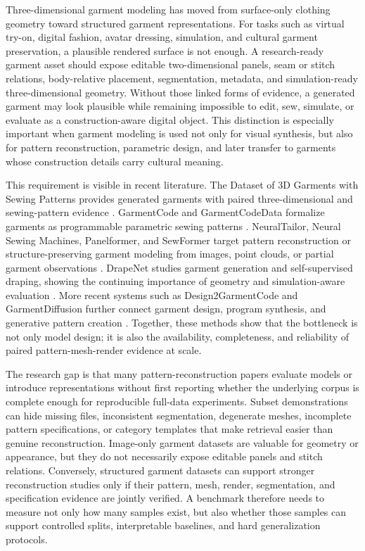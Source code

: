 \documentclass[pdflatex,sn-mathphys-num]{sn-jnl}
\begin{document}
Three-dimensional garment modeling has moved from surface-only clothing geometry toward structured garment representations. For tasks such as virtual try-on, digital fashion, avatar dressing, simulation, and cultural garment preservation, a plausible rendered surface is not enough. A research-ready garment asset should expose editable two-dimensional panels, seam or stitch relations, body-relative placement, segmentation, metadata, and simulation-ready three-dimensional geometry. Without those linked forms of evidence, a generated garment may look plausible while remaining impossible to edit, sew, simulate, or evaluate as a construction-aware digital object. This distinction is especially important when garment modeling is used not only for visual synthesis, but also for pattern reconstruction, parametric design, and later transfer to garments whose construction details carry cultural meaning.

This requirement is visible in recent literature. The Dataset of 3D Garments with Sewing Patterns provides generated garments with paired three-dimensional and sewing-pattern evidence \cite{korosteleva2021dataset}. GarmentCode and GarmentCodeData formalize garments as programmable parametric sewing patterns \cite{garmentcode2023,garmentcodedata2024}. NeuralTailor, Neural Sewing Machines, Panelformer, and SewFormer target pattern reconstruction or structure-preserving garment modeling from images, point clouds, or partial garment observations \cite{neuraltailor2022,nsm2022,panelformer2024,sewformer2023}. DrapeNet studies garment generation and self-supervised draping, showing the continuing importance of geometry and simulation-aware evaluation \cite{drapenet2023}. More recent systems such as Design2GarmentCode and GarmentDiffusion further connect garment design, program synthesis, and generative pattern creation \cite{design2garmentcode2025,garmentdiffusion2025}. Together, these methods show that the bottleneck is not only model design; it is also the availability, completeness, and reliability of paired pattern-mesh-render evidence at scale.

The research gap is that many pattern-reconstruction papers evaluate models or introduce representations without first reporting whether the underlying corpus is complete enough for reproducible full-data experiments. Subset demonstrations can hide missing files, inconsistent segmentation, degenerate meshes, incomplete pattern specifications, or category templates that make retrieval easier than genuine reconstruction. Image-only garment datasets are valuable for geometry or appearance, but they do not necessarily expose editable panels and stitch relations. Conversely, structured garment datasets can support stronger reconstruction studies only if their pattern, mesh, render, segmentation, and specification evidence are jointly verified. A benchmark therefore needs to measure not only how many samples exist, but also whether those samples can support controlled splits, interpretable baselines, and hard generalization protocols.
\end{document}
